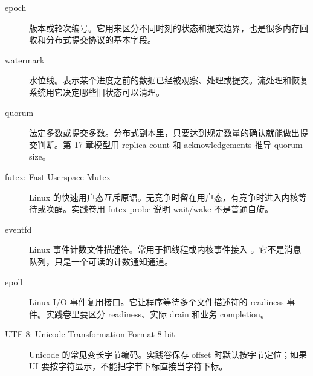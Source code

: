\begin{description}
  \item[epoch] 版本或轮次编号。它用来区分不同时刻的状态和提交边界，也是很多内存回收和分布式提交协议的基本字段。
  \item[watermark] 水位线。表示某个进度之前的数据已经被观察、处理或提交。流处理和恢复系统用它决定哪些旧状态可以清理。
  \item[quorum] 法定多数或提交多数。分布式副本里，只要达到规定数量的确认就能做出提交判断。第 17 章模型用 replica count 和 acknowledgements 推导 quorum size。
  \item[futex: Fast Userspace Mutex] Linux 的快速用户态互斥原语。无竞争时留在用户态，有竞争时进入内核等待或唤醒。实践卷用 futex probe 说明 wait/wake 不是普通自旋。
  \item[eventfd] Linux 事件计数文件描述符。常用于把线程或内核事件接入 。它不是消息队列，只是一个可读的计数通知通道。
  \item[epoll] Linux I/O 事件复用接口。它让程序等待多个文件描述符的 readiness 事件。实践卷里要区分 readiness、实际 drain 和业务 completion。
  \item[UTF-8: Unicode Transformation Format 8-bit] Unicode 的常见变长字节编码。实践卷保存 offset 时默认按字节定位；如果 UI 要按字符显示，不能把字节下标直接当字符下标。
\end{description}
